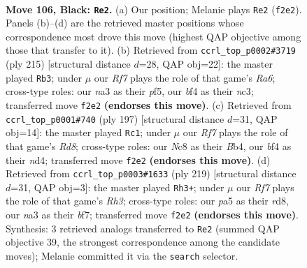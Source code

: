 \documentclass[11pt]{article}
\begin{document}
\clearpage

\begin{figure}[p]\centering
\begin{subfigure}{0.46\textwidth}\centering
\resizebox{\linewidth}{!}{%
\newchessgame
\chessboard[
  setfen={2n3K1/8/p4k2/P4p1p/5B2/N5P1/5rb1/R7 b - - 23 106},
  showmover=false,
  pgfstyle=straightmove, color=movearrow, markmove={f2-e2}
]}
\caption{}
\end{subfigure}\hfill
\begin{subfigure}{0.46\textwidth}\centering
\resizebox{\linewidth}{!}{%
\newchessgame
\chessboard[
  setfen={8/6k1/5p2/4pP2/2p3P1/r1N5/3B4/5K2 b - - 71 108},
  showmover=false,
  pgfstyle=straightmove, color=movearrow, markmove={a3-b3}
]}
\caption{}
\end{subfigure}
\\[4pt]
\begin{subfigure}{0.46\textwidth}\centering
\resizebox{\linewidth}{!}{%
\newchessgame
\chessboard[
  setfen={6k1/5p2/5P2/p5P1/Pb1NK2R/8/8/3r4 b - - 19 99},
  showmover=false,
  pgfstyle=straightmove, color=movearrow, markmove={d1-c1}
]}
\caption{}
\end{subfigure}\hfill
\begin{subfigure}{0.46\textwidth}\centering
\resizebox{\linewidth}{!}{%
\newchessgame
\chessboard[
  setfen={3R4/p4B2/P6r/1Pp1kb2/8/2K5/8/8 b - - 1 110},
  showmover=false,
  pgfstyle=straightmove, color=movearrow, markmove={h6-h3}
]}
\caption{}
\end{subfigure}
\caption{\textbf{Move 106, Black: \texttt{Re2}.} (a) Our position; Melanie plays \texttt{Re2} (\texttt{f2e2}). Panels (b)--(d) are the retrieved master positions whose correspondence most drove this move (highest QAP objective among those that transfer to it). (b) Retrieved from \texttt{ccrl\_top\_p0002\#3719} (ply 215) [structural distance $d$=28, QAP obj=22]: the master played \texttt{Rb3}; under $\mu$ our \emph{Rf7} plays the role of that game's \emph{Ra6}; cross-type roles: our \emph{n}a3 as their \emph{p}f5, our \emph{b}f4 as their \emph{n}c3; transferred move \texttt{f2e2} \textbf{(endorses this move)}. (c) Retrieved from \texttt{ccrl\_top\_p0001\#740} (ply 197) [structural distance $d$=31, QAP obj=14]: the master played \texttt{Rc1}; under $\mu$ our \emph{Rf7} plays the role of that game's \emph{Rd8}; cross-type roles: our \emph{N}c8 as their \emph{B}b4, our \emph{b}f4 as their \emph{n}d4; transferred move \texttt{f2e2} \textbf{(endorses this move)}. (d) Retrieved from \texttt{ccrl\_top\_p0003\#1633} (ply 219) [structural distance $d$=31, QAP obj=3]: the master played \texttt{Rh3+}; under $\mu$ our \emph{Rf7} plays the role of that game's \emph{Rh3}; cross-type roles: our \emph{p}a5 as their \emph{r}d8, our \emph{n}a3 as their \emph{b}f7; transferred move \texttt{f2e2} \textbf{(endorses this move)}. Synthesis: 3 retrieved analogs transferred to \texttt{Re2} (summed QAP objective 39, the strongest correspondence among the candidate moves); Melanie committed it via the \texttt{search} selector.}
\label{fig:thought-m211}
\end{figure}
\end{document}
